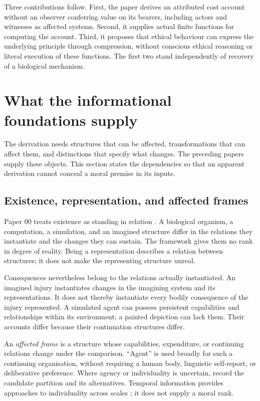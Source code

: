 \documentclass[11pt,a4paper]{article}
\theoremstyle{remark}
\begin{document}
Three contributions follow. First, the paper derives an attributed cost account
without an observer conferring value on its bearers, including actors and
witnesses as affected systems. Second, it supplies actual
finite functions for computing the account. Third, it proposes that ethical
behaviour can express the underlying principle through compression, without
conscious ethical reasoning or literal execution of these functions. The first
two stand independently of recovery of a biological mechanism.

\section{What the informational foundations supply}\label{sec:foundations}

The derivation needs structures that can be affected, transformations that can
affect them, and distinctions that specify what changes. The preceding papers
supply these objects. This section states the dependencies so that an apparent
derivation cannot conceal a moral premise in its inputs.

\subsection{Existence, representation, and affected frames}

Paper 00 treats existence as standing in relation
\citep{parslow00relation}. A biological organism, a
computation, a simulation, and an imagined structure differ in the relations
they instantiate and the changes they can sustain. The framework gives them
no rank in degree of reality. Being a representation describes a relation
between structures; it does not make the representing structure unreal.

Consequences nevertheless belong to the relations actually instantiated. An
imagined injury instantiates changes in the imagining system and its
representations. It does not thereby instantiate every bodily consequence of
the injury represented. A simulated agent can possess persistent capabilities
and relationships within its environment; a painted depiction can lack them.
Their accounts differ because their continuation structures differ.

An \emph{affected frame} is a structure whose capabilities, expenditure, or
continuing relations change under the comparison. ``Agent'' is used broadly for
such a continuing organisation, without requiring a human body, linguistic
self-report, or deliberative preference. Where agency or individuality is
uncertain, record the candidate partition and its alternatives. Temporal
information provides approaches to individuality across scales
\citep{krakauer2020individuality}; it does not supply a moral rank.
\end{document}
